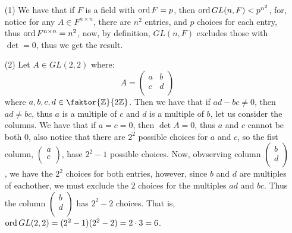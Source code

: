 \begin{example}
    \begin{enumerate}
        \item[(1)] We have that if $F$ is a field with  $\operatorname{ord}{F}=p$, then
            $\operatorname{ord}{GL(n,F)}<p^{n^2}$, for, notice for any $A \in F^{n \times n}$,
            there are $n^2$ entries, and  $p$ choices for each entry, thus
            $\operatorname{ord} {F^{n \times n}}=n^2$, now, by definition,  $GL(n,F)$ excludes
            those with $\det=0$, thus we get the result.

        \item[(2)] Let $A \in GL(2,2)$ where:
            \begin{equation*}
                A=\begin{pmatrix}
                    a   &   b   \\
                    c   &   d   \\
                  \end{pmatrix}
            \end{equation*}
            where $a,b,c,d \in \faktor{\Z}{2\Z}$. Then we have that if $ad-bc
            \neq 0$, then  $ad \neq bc$, thus $a$ is a multiple of  $c$ and  $d$
            is a multiple of  $b$, let us consider the columns. We have that if
             $a=c=0$, then  $\det{A}=0$, thus $a$ and  $c$ cannot be both  $0$,
             also notice that there are $2^2$ possible choices for  $a$
             and  $c$, so the fist column, $\begin{pmatrix}a \\ c
             \\\end{pmatrix}$, hase $2^2-1$ possible choices. Now, obvserving
             column $\begin{pmatrix}b \\ d \\\end{pmatrix}$, we have the $2^2$
             choices for both entries, however, since  $b$ and  $d$ are
             multiples of eachother, we must exclude the $2$ choices for the
             multiples $ad$ and  $bc$. Thus the column $\begin{pmatrix}b \\ d
             \\\end{pmatrix}$ has $2^2-2$ choices. That is,
             $\operatorname{ord}{GL(2,2)}=(2^2-1)(2^2-2)=2 \cdot 3=6$.
    \end{enumerate}
\end{example}

